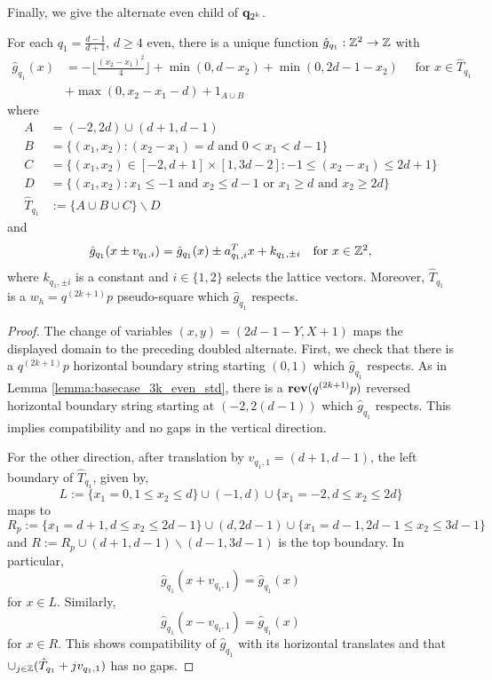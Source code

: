 \documentclass[12pt]{amsart}
\begin{document}


Finally, we give the alternate even child of $\mathbf{q}_{2^k}$.
\begin{lemma} \label{lemma:basecase_2k_even_alt}
	For each $q_1 = \frac{d-1}{d+1}$, $d \geq 4$ even, there is a unique function $\hat{g}_{q_1}: \mathbb{Z}^2 \to \mathbb{Z}$ with
	\[
	\begin{aligned}
	\hat{g}_{q_1}(x) &= -\lfloor \frac{(x_2-x_1)^2}{4} \rfloor + \min(0, d-x_2) + \min(0, 2d-1-x_2) \quad \mbox{ for $x \in \hat T_{q_1}$} \\
	&+ \max(0, x_2-x_1-d) + 1_{A \cup B}
	\end{aligned}
	\]
	where
	\begin{align*}
	A &=  (-2,2d) \cup (d+1,d-1) \\
	B &= \{ (x_1, x_2) : (x_2-x_1) = d \mbox{ and } 0 < x_1 < d-1\} \\
	C &=  \{ (x_1, x_2) \in [-2, d+1] \times [1, 3d-2] : -1 \leq (x_2 -x_1) \leq 2d + 1\} \\ 
	D &= \{ (x_1, x_2) : x_1 \leq -1 \mbox{ and } x_2 \leq d-1 \mbox{ or } x_1 \geq d \mbox{ and } x_2 \geq 2d \}  \\
	\hat T_{q_1} &:=  \{A \cup B \cup C \} \backslash D
	\end{align*}
	and
	\[
	\hat{g}_{q_1}(x \pm v_{q_1,i}) = \hat g_{q_1}(x) \pm a_{q_1,i}^T x + k_{q_1, \pm i}  \quad \mbox{for $x \in \mathbb{Z}^2$},
	\]
	where $k_{q_1, \pm i}$ is a constant and $i \in \{1,2\}$ selects the lattice vectors. Moreover, $\hat{T}_{q_1}$ is a $w_h = q^{(2k+1)} p$ pseudo-square which $\hat{g}_{q_1}$ respects.
\end{lemma}

\begin{proof}
	The change of variables $(x,y)=(2d-1-Y,X+1)$ maps the displayed domain to the preceding doubled alternate.  First, we check that there is a $q^{(2k+1)} p$ horizontal boundary string
	starting $(0,1)$ which $\hat{g}_{q_1}$ respects. As in Lemma \ref{lemma:basecase_3k_even_std}, there is a 
	$\mathop{\bf rev}(q^{(2k+1)} p)$ reversed horizontal boundary string starting at $(-2, 2(d-1))$ which $\hat{g}_{q_1}$ respects. This implies 
	compatibility and no gaps in the vertical direction. 
	
	
	For the other direction, after translation by $v_{q_1,1} = (d+1, d-1)$, the left boundary of $\hat{T}_{q_1}$, given by,  
	\[
	L := \{ x_1 = 0, 1 \leq x_2 \leq d\} \cup (-1, d) \cup \{ x_1 = -2,  d \leq x_2 \leq 2 d\}
	\]
	maps to 
	\[
	R_p := \{ x_1 = d+1, d \leq x_2 \leq 2d-1\} \cup (d, 2d-1) \cup \{ x_1 = d-1,  2d-1 \leq x_2 \leq 3 d-1\}
	\]
	and $R := R_p \cup (d+1,d-1) \backslash (d-1, 3d-1)$ is the top boundary. In particular, 
	\[
	\hat{g}_{q_1}(x+v_{q_1,1}) = \hat{g}_{q_1}(x)
	\]
	for $x \in L$. Similarly, 
	\[
	\hat{g}_{q_1}(x-v_{q_1,1}) = \hat{g}_{q_1}(x) 
	\]
	for $x \in R$. This shows compatibility of $\hat{g}_{q_1}$ with its horizontal translates and that $\cup_{j \in \mathbb{Z}} (\hat{T}_{q_1} + j v_{q_1,1})$ has no gaps. 
\end{proof}
\end{document}
